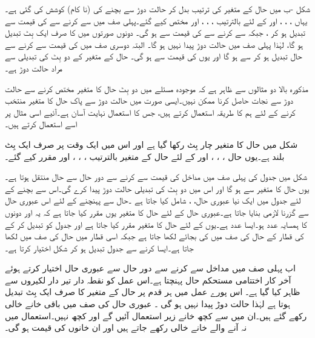 شکل   -ب میں حال کے متغیر کی ترتیب بدل کر  حالت دوڑ  سے بچنے  کی  (نا کام) کوشش کی گئی ہے۔ یہاں ، ، ، اور  کے لئے بالترتیب ، ، ، اور  مختص کیے گئے۔پہلی صف  میں   سے    کرنے سے  کی قیمت  سے تبدیل ہو کر  ، جبکہ  سے  کرنے سے  کی قیمت  سے  ہو گی۔  دونوں صورتوں میں  کا صرف ایک بِٹ تبدیل ہو گا، لہٰذا پہلی صف میں حالت دوڑ پیدا نہیں ہو گا۔ البتہ دوسری صف میں  کی قیمت  سے  کرنے سے حال تبدیل ہو کر  سے  ہو گا اور یوں  کی قیمت  سے  ہو گی۔ حال کے متغیر کے دو بِٹ کی تبدیلی سے مراد حالت دوڑ ہے۔

مذکورہ بالا دو مثالوں سے ظاہر ہے کہ موجودہ مسئلے میں دو بِٹ  حال کا متغیر  مختص کرنے  سے حالت دوڑ سے نجات حاصل کرنا ممکن نہیں۔ایسی صورت میں حالت دوڑ سے پاک حال کا متغیر منتخب کرنے  کے لئے ہم   کا طریقہ استعمال کرتے ہیں، جس کا استعمال  نہایت آسان ہے۔آئیے  اسی مثال پر اسے  استعمال کرتے  ہیں۔

شکل میں  حال کا متغیر چار بِٹ رکھا گیا ہے اور اس میں ایک وقت پر   صرف ایک  بِٹ بلند ہے۔یوں حال   ، ، ، اور  کے لئے حال کے متغیر  بالترتیب ، ، ، اور   مقرر کیے گئے۔


شکل    میں جدول کی پہلی صف میں  مداخل کی قیمت   سے   کرنے سے دور حال  سے حال   منتقل ہوتا ہے۔یوں حال کا متغیر   سے  ہو گا اور اس میں دو بِٹ کی تبدیلی حالت دوڑ  پیدا کرے گی۔اس سے  بچنے کے لئے جدول میں ایک نیا عبوری حال، ، شامل کیا جاتا ہے ۔حال   سے   پہنچنے کے لئے اس عبوری حال سے گزرنا  لازمی بنایا جاتا ہے۔عبوری حال     کے لئے حال کا متغیر یوں مقرر کیا جاتا ہے کہ یہ   اور  دونوں کا ہمسایہ عدد ہو۔ایسا عدد   ہے۔یوں   کے لئے  حال کا متغیر  مقرر کیا جاتا ہے اور جدول کو تبدیل کر کے  کی قطار کے حال   کی صف میں  کی بجائے  لکھا جاتا ہے جبکہ اسی قطار میں حال   کی صف میں  لکھا جاتا ہے۔ایسا کرنے سے جدول تبدیل ہو کر شکل   اختیار کرتا ہے۔


اب پہلی صف میں مداخل   سے   کرنے سے  دور حال   سے عبوری حال   اختیار کرتے ہوئے آخر کار اختتامی مستحکم  حال   پہنچتا ہے۔اس  عمل  کو نقطہ دار  تیر دار لکیروں سے  ظاہر کیا گیا ہے۔  اس پورے عمل میں  ہر قدم پر حال کے متغیر کا صرف ایک بِٹ تبدیل ہوتا ہے  لہٰذا حالت دوڑ  پیدا نہیں ہو گی ۔ عبوری حال  کی صف میں  باقی خانے خالی رکھے گئے ہیں۔ان میں سے کچھ خانے زیر استعمال آئیں گے اور کچھ نہیں۔استعمال  میں نہ آنے والے خانے خالی رکھے جاتے ہیں اور ان خانوں  کی قیمت ہو گی۔


